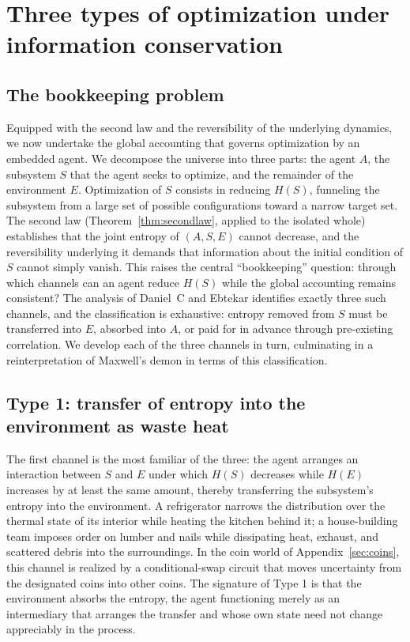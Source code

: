 \documentclass[10pt]{article}
\theoremstyle{definition}
\theoremstyle{remark}
\begin{document}
\section{Three types of optimization under information conservation}
\label{sec:threetypes}

\subsection{The bookkeeping problem}
\label{sec:bookkeeping}

Equipped with the second law and the reversibility of the underlying dynamics, we now undertake the global accounting that governs optimization by an embedded agent. We decompose the universe into three parts: the agent $A$, the subsystem $S$ that the agent seeks to optimize, and the remainder of the environment $E$. Optimization of $S$ consists in reducing $H(S)$, funneling the subsystem from a large set of possible configurations toward a narrow target set. The second law (Theorem~\ref{thm:secondlaw}, applied to the isolated whole) establishes that the joint entropy of $(A, S, E)$ cannot decrease, and the reversibility underlying it demands that information about the initial condition of $S$ cannot simply vanish. This raises the central ``bookkeeping'' question: through which channels can an agent reduce $H(S)$ while the global accounting remains consistent? The analysis of Daniel~C and Ebtekar identifies exactly three such channels, and the classification is exhaustive: entropy removed from $S$ must be transferred into $E$, absorbed into $A$, or paid for in advance through pre-existing correlation. We develop each of the three channels in turn, culminating in a reinterpretation of Maxwell's demon in terms of this classification.

\subsection{Type 1: transfer of entropy into the environment as waste heat}
\label{sec:type1}

The first channel is the most familiar of the three: the agent arranges an interaction between $S$ and $E$ under which $H(S)$ decreases while $H(E)$ increases by at least the same amount, thereby transferring the subsystem's entropy into the environment. A refrigerator narrows the distribution over the thermal state of its interior while heating the kitchen behind it; a house-building team imposes order on lumber and nails while dissipating heat, exhaust, and scattered debris into the surroundings. In the coin world of Appendix~\ref{sec:coins}, this channel is realized by a conditional-swap circuit that moves uncertainty from the designated coins into other coins. The signature of Type 1 is that the environment absorbs the entropy, the agent functioning merely as an intermediary that arranges the transfer and whose own state need not change appreciably in the process.
\end{document}
